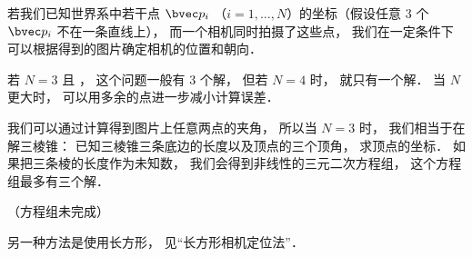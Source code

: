 
\begin{issues}
\issueDraft
\end{issues}


若我们已知世界系中若干点 $\bvec p_i$ （$i = 1, \dots, N$）的坐标（假设任意 3 个 $\bvec p_i$ 不在一条直线上）， 而一个相机同时拍摄了这些点， 我们在一定条件下可以根据得到的图片确定相机的位置和朝向．

若 $N = 3$ 且 ， 这个问题一般有 3 个解， 但若 $N = 4$ 时， 就只有一个解． 当 $N$ 更大时， 可以用多余的点进一步减小计算误差．

我们可以通过计算得到图片上任意两点的夹角， 所以当 $N = 3$ 时， 我们相当于在解三棱锥： 已知三棱锥三条底边的长度以及顶点的三个顶角， 求顶点的坐标． 如果把三条棱的长度作为未知数， 我们会得到非线性的三元二次方程组， 这个方程组最多有三个解．

（方程组未完成）

另一种方法是使用长方形， 见“长方形相机定位法”．
